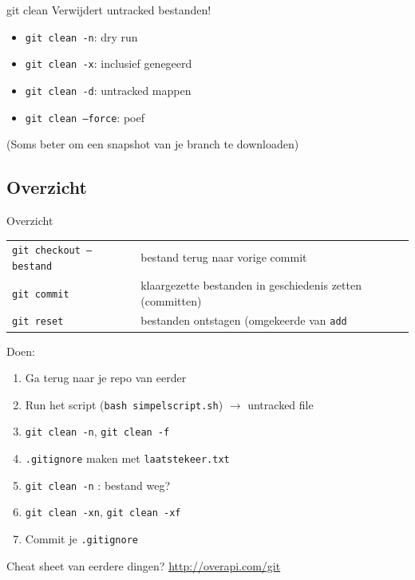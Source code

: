 \begin{frame}{git clean}
	\alert{Verwijdert untracked bestanden!}
	\begin{itemize}
		\item \texttt{git clean -n}: dry run
		\item \texttt{git clean -x}: inclusief genegeerd
		\item \texttt{git clean -d}: untracked mappen
		\item \texttt{git clean --force}: \alert{poef}
	\end{itemize}
	(Soms beter om een snapshot van je branch te downloaden)
\end{frame}

\subsection{Overzicht}
\begin{frame}{Overzicht}
	{ \footnotesize
	\begin{tabular}{ll}
		\texttt{git checkout -- bestand}		& bestand terug naar vorige commit	\\
		\texttt{git commit} & klaargezette bestanden in geschiedenis zetten (committen)\\
		\texttt{git reset}	& bestanden ontstagen (omgekeerde van \texttt{add}
	\end{tabular}
	}
	Doen:
	\begin{enumerate}
		\item Ga terug naar je repo van eerder
		\item Run het script (\texttt{bash simpelscript.sh}) $\rightarrow$ untracked file
		\item \texttt{git clean -n}, \texttt{git clean -f}
		\item \texttt{.gitignore} maken met \texttt{laatstekeer.txt}
		\item \texttt{git clean -n} : bestand weg?
		\item \texttt{git clean -xn}, \texttt{git clean -xf}
		\item Commit je \texttt{.gitignore}
	\end{enumerate}
	Cheat sheet van eerdere dingen? \url{http://overapi.com/git}
\end{frame}
